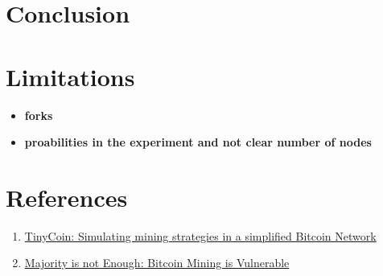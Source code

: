 \documentclass{article}
\begin{document}
\subsection{} 





\section{Conclusion}




\section{Limitations} 

\begin{itemize}
\item \textbf{forks}
\item \textbf{proabilities in the experiment and not clear number of nodes}
\end{itemize}

\section{References} 
\begin{enumerate}
\item \href{https://elearning.di.unipi.it/pluginfile.php/14179/mod_assign/intro/SelfishMining.pdf}{TinyCoin: Simulating mining strategies in a simplified Bitcoin Network}
\item \href{https://elearning.di.unipi.it/pluginfile.php/14179/mod_assign/intro/MajorityisNotEnough.pdf}{Majority is not Enough: Bitcoin Mining is Vulnerable}
\end{enumerate}
\end{document}
